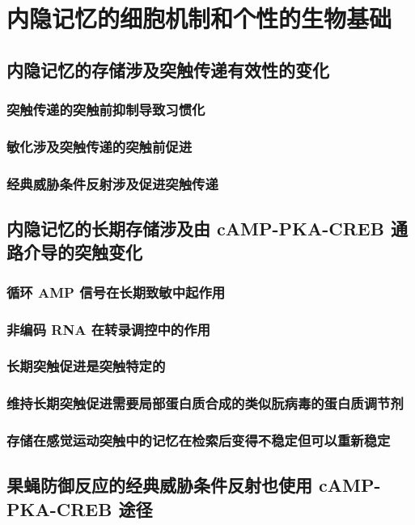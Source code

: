 \chapter{内隐记忆的细胞机制和个性的生物基础}

\section{内隐记忆的存储涉及突触传递有效性的变化}
\subsection{突触传递的突触前抑制导致习惯化}
\subsection{敏化涉及突触传递的突触前促进}
\subsection{经典威胁条件反射涉及促进突触传递}

\section{内隐记忆的长期存储涉及由 cAMP-PKA-CREB 通路介导的突触变化}
\subsection{循环 AMP 信号在长期致敏中起作用}
\subsection{非编码 RNA 在转录调控中的作用}
\subsection{长期突触促进是突触特定的}
\subsection{维持长期突触促进需要局部蛋白质合成的类似朊病毒的蛋白质调节剂}
\subsection{存储在感觉运动突触中的记忆在检索后变得不稳定但可以重新稳定}

\section{果蝇防御反应的经典威胁条件反射也使用 cAMP-PKA-CREB 途径}

